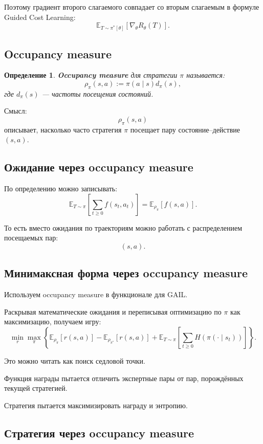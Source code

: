 \documentclass[12pt,a4paper]{article}
\newtheorem{definition}{Определение}
\begin{document}
Поэтому градиент второго слагаемого совпадает со вторым слагаемым в формуле Guided Cost Learning:
\[
\mathbb E_{T\sim\pi^\ast[\theta]}
\left[
\nabla_\theta R_\theta(T)
\right].
\]

\subsection{Occupancy measure}

\begin{definition}
\textbf{Occupancy measure} для стратегии $\pi$ называется:
\[
\rho_\pi(s,a)
:=
\pi(a\mid s)d_\pi(s),
\]
где $d_\pi(s)$ --- частоты посещения состояний.
\end{definition}

Смысл:
\[
\rho_\pi(s,a)
\]
описывает, насколько часто стратегия $\pi$ посещает пару состояние--действие $(s,a)$.

\subsection{Ожидание через occupancy measure}

По определению можно записывать:
\[
\mathbb E_{T\sim\pi}
\left[
\sum_{t\ge 0}
f(s_t,a_t)
\right]
=
\mathbb E_{\rho_\pi}
\left[
f(s,a)
\right].
\]

То есть вместо ожидания по траекториям можно работать с распределением посещаемых пар:
\[
(s,a).
\]

\subsection{Минимаксная форма через occupancy measure}

Используем occupancy measure в функционале для GAIL.

Раскрывая математические ожидания и переписывая оптимизацию по $\pi$ как максимизацию, получаем игру:
\[
\min_r
\max_\pi
\left\{
\mathbb E_{\rho_\pi}
\left[
r(s,a)
\right]
-
\mathbb E_{\rho_{\pi^\ast}}
\left[
r(s,a)
\right]
+
\mathbb E_{T\sim\pi}
\left[
\sum_{t\ge 0}
H(\pi(\cdot\mid s_t))
\right]
\right\}.
\]

Это можно читать как поиск седловой точки.

Функция награды пытается отличить экспертные пары от пар, порождённых текущей стратегией.

Стратегия пытается максимизировать награду и энтропию.

\subsection{Стратегия через occupancy measure}
\end{document}
